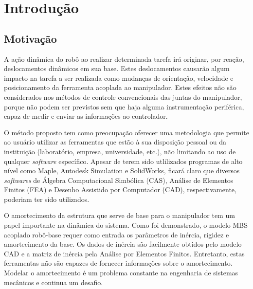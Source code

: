 \chapter{Introdução}

% 

\section{Motivação}

A ação dinâmica do robô ao realizar determinada tarefa irá originar, por reação,
deslocamentos dinâmicos em sua base. Estes deslocamentos causarão algum impacto
na tarefa a ser realizada como mudanças de orientação, velocidade e
posicionamento da ferramenta acoplada ao manipulador. Estes efeitos não são
considerados nos métodos de controle convencionais das juntas do manipulador,
porque não podem ser previstos sem que haja alguma instrumentação periférica,
capaz de medir e enviar as informações ao controlador.

O método proposto tem como preocupação oferecer uma metodologia que permite ao
usuário utilizar as ferramentas que estão à sua disposição pessoal ou da
instituição (laboratório, empresa, universidade, etc.), não limitando ao uso de
qualquer \textit{software} específico. Apesar de terem sido utlilizados
programas de alto nível como Maple, Autodesk Simulation e SolidWorks, ficará
claro que diversos \textit{softwares} de Álgebra Computacional Simbólica (CAS),
Análise de Elementos Finitos (FEA) e Desenho Assistido por Computador (CAD),
respectivamente, poderiam ter sido utilizados.

O amortecimento da estrutura que serve de base para o manipulador tem um papel
importante na dinâmica do sistema. Como foi demonstrado, o modelo MBS
acoplado robô-base requer como entrada os parâmetros de inércia, rigidez e amortecimento
da base. Os dados de inércia são facilmente obtidos pelo modelo CAD e a matriz
de inércia pela Análise por Elementos Finitos. Entretanto, estas
ferramentas não são capazes de fornecer informações sobre o amortecimento.
Modelar o amortecimento é um problema constante na engenharia de sistemas
mecânicos e continua um desafio.

